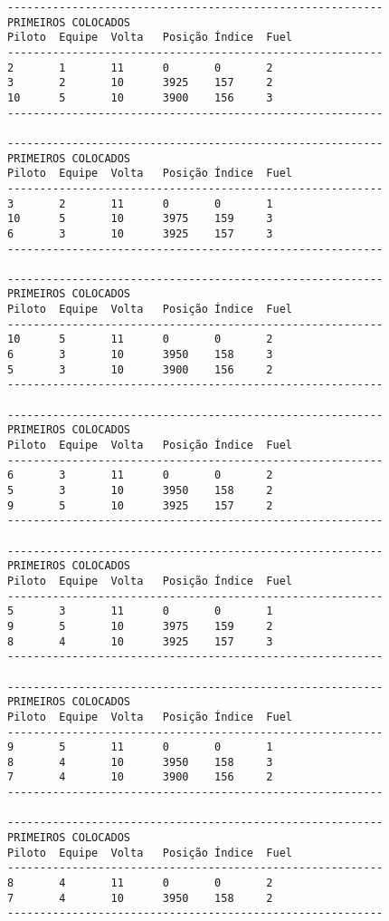 \documentclass[12pt]{article}
\begin{document}
\begin{verbatim}
----------------------------------------------------------
PRIMEIROS COLOCADOS
Piloto  Equipe  Volta   Posição Índice  Fuel
----------------------------------------------------------
2       1       11      0       0       2
3       2       10      3925    157     2
10      5       10      3900    156     3
----------------------------------------------------------

----------------------------------------------------------
PRIMEIROS COLOCADOS
Piloto  Equipe  Volta   Posição Índice  Fuel
----------------------------------------------------------
3       2       11      0       0       1
10      5       10      3975    159     3
6       3       10      3925    157     3
----------------------------------------------------------

----------------------------------------------------------
PRIMEIROS COLOCADOS
Piloto  Equipe  Volta   Posição Índice  Fuel
----------------------------------------------------------
10      5       11      0       0       2
6       3       10      3950    158     3
5       3       10      3900    156     2
----------------------------------------------------------

----------------------------------------------------------
PRIMEIROS COLOCADOS
Piloto  Equipe  Volta   Posição Índice  Fuel
----------------------------------------------------------
6       3       11      0       0       2
5       3       10      3950    158     2
9       5       10      3925    157     2
----------------------------------------------------------

----------------------------------------------------------
PRIMEIROS COLOCADOS
Piloto  Equipe  Volta   Posição Índice  Fuel
----------------------------------------------------------
5       3       11      0       0       1
9       5       10      3975    159     2
8       4       10      3925    157     3
----------------------------------------------------------

----------------------------------------------------------
PRIMEIROS COLOCADOS
Piloto  Equipe  Volta   Posição Índice  Fuel
----------------------------------------------------------
9       5       11      0       0       1
8       4       10      3950    158     3
7       4       10      3900    156     2
----------------------------------------------------------

----------------------------------------------------------
PRIMEIROS COLOCADOS
Piloto  Equipe  Volta   Posição Índice  Fuel
----------------------------------------------------------
8       4       11      0       0       2
7       4       10      3950    158     2
----------------------------------------------------------


\end{verbatim}
\end{document}
